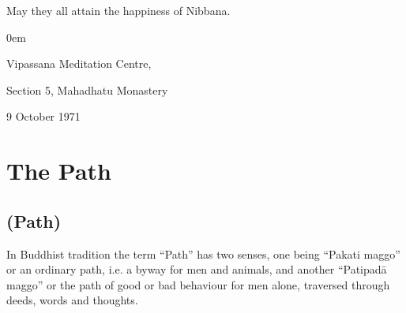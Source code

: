 \documentclass[a5paper,10pt,english]{book}
\begin{document}
\sphinxAtStartPar
May they all attain the happiness of Nibbana.

\begin{DUlineblock}{0em}
\item[] 
\item[] Vipassana Meditation Centre,
\item[] Section 5, Mahadhatu Monastery
\item[] 9 October 1971
\end{DUlineblock}

\egroup
\mainmatter

\sphinxstepscope


\chapter{The Path}
\label{\detokenize{path:the-path}}\label{\detokenize{path::doc}}

\section{(Path)}
\label{\detokenize{path:path}}
\sphinxAtStartPar
In Buddhist tradition the term “Path” has two senses, one being “Pakati maggo” or an ordinary path, i.e. a byway for men and animals, and another “Patipadā maggo” or the path of good or bad behaviour for men alone, traversed through deeds, words and thoughts.
\end{document}
